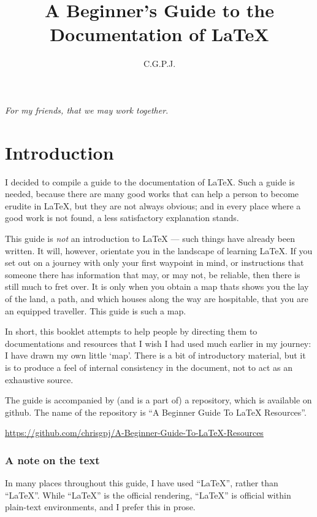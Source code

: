 \documentclass[11pt, oneside]{memoir}
\title{A Beginner's Guide to the Documentation of \LaTeX{}}
\author{C.\thinspace G.\thinspace P.\thinspace J.\thinspace}
\begin{document}
\maketitle
\thispagestyle{empty}

\RaggedRight
\newpage
\thispagestyle{empty}
\emph{For my friends, that we may work together}.

\newpage
\tableofcontents

\chapter{Introduction}
I decided to compile a guide to the documentation of \LaTeX{}. Such a guide is needed, because there are many good works that can help a person to become erudite in \LaTeX{}, but they are not always obvious; and in every place where a good work is not found, a less satisfactory explanation stands.

This guide is \emph{not} an introduction to LaTeX — such things have already been written. It will, however, orientate you in the landscape of learning LaTeX. If you set out on a journey with only your first waypoint in mind, or instructions that someone there has information that may, or may not, be reliable, then there is still much to fret over. It is only when you obtain a map thats shows you the lay of the land, a path, and which houses along the way are hospitable, that you are an equipped traveller. This guide is such a map.

In short, this booklet attempts to help people by directing them to documentations and resources that I wish I had used much earlier in my journey: I have drawn my own little `map'. There is a bit of introductory material, but it is to produce a feel of internal consistency in the document, not to act as an exhaustive source.

The guide is accompanied by (and is a part of) a repository, which is available on github. The name of the repository is ``A Beginner Guide To LaTeX Resources''.

\url{https://github.com/chrisgpj/A-Beginner-Guide-To-LaTeX-Resources}

\subsection{A note on the text}
In many places throughout this guide, I have used ``LaTeX'', rather than ``\LaTeX{}''. While ``\LaTeX{}'' is the official rendering, ``LaTeX'' is official within plain-text environments, and I prefer this in prose.
\end{document}
